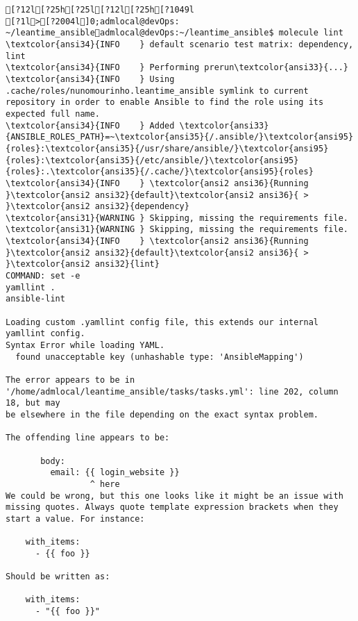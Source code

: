 \documentclass{scrartcl}
\begin{document}
\begin{Verbatim}
[?12l[?25h[?25l[?12l[?25h[?1049l
[?1l>[?2004l]0;admlocal@devOps: ~/leantime_ansibleadmlocal@devOps:~/leantime_ansible$ molecule lint
\textcolor{ansi34}{INFO    } default scenario test matrix: dependency, lint
\textcolor{ansi34}{INFO    } Performing prerun\textcolor{ansi33}{...}
\textcolor{ansi34}{INFO    } Using .cache/roles/nunomourinho.leantime_ansible symlink to current repository in order to enable Ansible to find the role using its expected full name.
\textcolor{ansi34}{INFO    } Added \textcolor{ansi33}{ANSIBLE_ROLES_PATH}=~\textcolor{ansi35}{/.ansible/}\textcolor{ansi95}{roles}:\textcolor{ansi35}{/usr/share/ansible/}\textcolor{ansi95}{roles}:\textcolor{ansi35}{/etc/ansible/}\textcolor{ansi95}{roles}:.\textcolor{ansi35}{/.cache/}\textcolor{ansi95}{roles}
\textcolor{ansi34}{INFO    } \textcolor{ansi2 ansi36}{Running }\textcolor{ansi2 ansi32}{default}\textcolor{ansi2 ansi36}{ > }\textcolor{ansi2 ansi32}{dependency}
\textcolor{ansi31}{WARNING } Skipping, missing the requirements file.
\textcolor{ansi31}{WARNING } Skipping, missing the requirements file.
\textcolor{ansi34}{INFO    } \textcolor{ansi2 ansi36}{Running }\textcolor{ansi2 ansi32}{default}\textcolor{ansi2 ansi36}{ > }\textcolor{ansi2 ansi32}{lint}
COMMAND: set -e
yamllint .
ansible-lint

Loading custom .yamllint config file, this extends our internal yamllint config.
Syntax Error while loading YAML.
  found unacceptable key (unhashable type: 'AnsibleMapping')

The error appears to be in '/home/admlocal/leantime_ansible/tasks/tasks.yml': line 202, column 18, but may
be elsewhere in the file depending on the exact syntax problem.

The offending line appears to be:

       body:
         email: {{ login_website }}
                 ^ here
We could be wrong, but this one looks like it might be an issue with
missing quotes. Always quote template expression brackets when they
start a value. For instance:

    with_items:
      - {{ foo }}

Should be written as:

    with_items:
      - "{{ foo }}"


\end{Verbatim}
\end{document}
